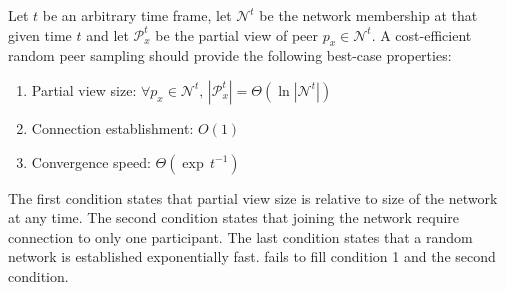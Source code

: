 \begin{problem}
  Let $t$ be an arbitrary time frame, let $\mathcal{N}^t$ be the
  network membership at that given time $t$ and let $\mathcal{P}_x^t$
  be the partial view of peer $p_x \in \mathcal{N}^t$.  A
  cost-efficient random peer sampling should provide the following
  best-case properties:
  \begin{enumerate}
  \item  \begin{center}
    Partial view size: \hfill
    $\forall p_x \in \mathcal{N}^t,\, |\mathcal{P}_x^t| = \Theta (\ln
    |\mathcal{N}^t|)$
  \end{center}
  
\item \begin{center}
    Connection establishment: \hfill $O(1)$
  \end{center}
 
\item  \begin{center}
    Convergence speed: \hfill $\Theta(\exp \, t^{-1})$
  \end{center}
  \end{enumerate}
\end{problem}

The first condition states that partial view size is relative to size
of the network at any time. The second condition states that joining
the network require connection to only one participant. The last
condition states that a random network is established exponentially
fast. \CYCLON{} fails to fill condition 1 and \SCAMP{} the second
condition.

